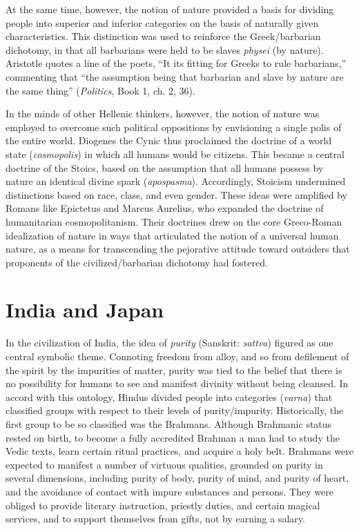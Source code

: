 At the same time, however, the notion of nature provided a basis for dividing people into superior and inferior categories on the basis of naturally given characteristics. This distinction was used to reinforce the Greek/barbarian dichotomy, in that all barbarians were held to be slaves \emph{physei} (by nature). Aristotle quotes a line of the poets, ``It its fitting for Greeks to rule barbarians,'' commenting that ``the assumption being that barbarian and slave by nature are the same thing'' (\emph{Politics}, Book 1, ch. 2, 36).

In the minds of other Hellenic thinkers, however, the notion of nature was employed to overcome such political oppositions by envisioning a single polis of the entire world. Diogenes the Cynic thus proclaimed the doctrine of a world state (\emph{cosmopolis}) in which all humans would be citizens. This became a central doctrine of the Stoics, based on the assumption that all humans possess by nature an identical divine spark (\emph{apospasma}). Accordingly, Stoicism undermined distinctions based on race, class, and even gender. These ideas were amplified by Romans like Epictetus and Marcus Aurelius, who expanded the doctrine of humanitarian cosmopolitanism. Their doctrines drew on the core Greco-Roman idealization of nature in ways that articulated the notion of a universal human nature, as a means for transcending the pejorative attitude toward outsiders that proponents of the civilized/barbarian dichotomy had fostered.

\section*{India and Japan}

In the civilization of India, the idea of \emph{purity} (Sanskrit: \emph{sattva}) figured as one central symbolic theme. Connoting freedom from alloy, and so from defilement of the spirit by the impurities of matter, purity was tied to the belief that there is no possibility for humans to see and manifest divinity without being cleansed. In accord with this ontology, Hindus divided people into categories (\emph{varna}) that classified groups with respect to their levels of purity/impurity. Historically, the first group to be so classified was the Brahmans. Although Brahmanic status rested on birth, to become a fully accredited Brahman a man had to study the Vedic texts, learn certain ritual practices, and acquire a holy belt. Brahmans were expected to manifest a number of virtuous qualities, grounded on purity in several dimensions, including purity of body, purity of mind, and purity of heart, and the avoidance of contact with impure substances and persons. They were obliged to provide literary instruction, priestly duties, and certain magical services, and to support themselves from gifts, not by earning a salary. 

